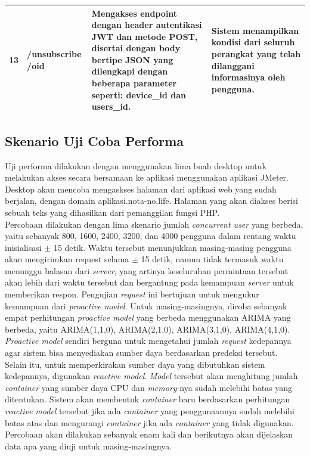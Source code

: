 \begin{longtable}{|p{}|p{}|p{}|p{}|}
            	13 & /unsubscribe /oid & Mengakses endpoint dengan header autentikasi JWT dan metode POST, disertai dengan body bertipe JSON yang dilengkapi dengan beberapa parameter seperti: device\_id dan users\_id. & Sistem menampilkan kondisi dari seluruh perangkat yang telah dilanggani informasinya oleh pengguna. \\ \hline
            \end{longtable}
            
        
    \subsection{Skenario Uji Coba Performa}
    	Uji performa dilakukan dengan menggunakan lima buah desktop untuk melakukan akses secara bersamaan ke aplikasi menggunakan aplikasi JMeter. Desktop akan mencoba mengaskses halaman dari aplikasi web yang sudah berjalan, dengan domain aplikasi.nota-no.life. Halaman yang akan diakses berisi sebuah teks yang dihasilkan dari pemanggilan fungsi PHP. \\
        \indent Percobaan dilakukan dengan lima skenario jumlah \textit{concurrent user} yang berbeda, yaitu sebanyak 800, 1600, 2400, 3200, dan 4000 pengguna dalam rentang waktu inisialisasi $\pm$ 15 detik. Waktu tersebut menunjukkan masing-masing pengguna akan mengirimkan request selama $\pm$ 15 detik, namun tidak termasuk waktu menunggu balasan dari \textit{server}, yang artinya keseluruhan permintaan tersebut akan lebih dari waktu tersebut dan bergantung pada kemampuan \textit{server} untuk memberikan respon. Pengujian \textit{request} ini bertujuan untuk mengukur kemampuan dari \textit{proactive model}. Untuk masing-masingnya, dicoba sebanyak empat perhitungan \textit{proactive model} yang berbeda menggunakan ARIMA yang berbeda, yaitu ARIMA(1,1,0), ARIMA(2,1,0), ARIMA(3,1,0), ARIMA(4,1,0). \textit{Proactive model} sendiri berguna untuk mengetahui jumlah \textit{request} kedepannya agar sistem bisa menyediakan sumber daya berdasarkan predeksi tersebut. \\
        \indent Selain itu, untuk memperkirakan sumber daya yang dibutuhkan sistem kedepannya, digunakan \textit{reactive model}. \textit{Model} tersebut akan menghitung jumlah \textit{container} yang sumber daya CPU dan \textit{memory}-nya sudah melebihi batas yang ditentukan. Sistem akan membentuk \textit{container} baru berdasarkan perhitungan \textit{reactive model} tersebut jika ada \textit{container} yang penggunaannya sudah melebihi batas atas dan mengurangi \textit{container} jika ada \textit{container} yang tidak digunakan. Percobaan akan dilakukan sebanyak enam kali dan berikutnya akan dijelaskan data apa yang diuji untuk masing-masingnya. \\
        \indent
